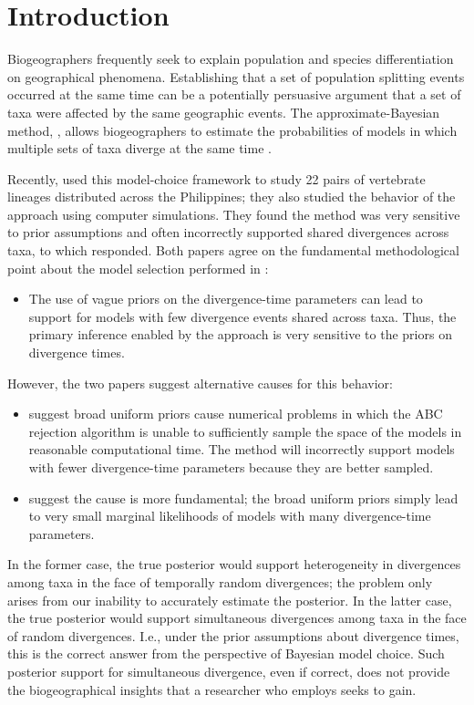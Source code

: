 \section{Introduction}
Biogeographers frequently seek to explain population and species
differentiation on geographical phenomena.
Establishing that a set of population splitting events occurred
at the same time can be a potentially persuasive argument that a set of taxa
were affected by the same geographic events.
The approximate-Bayesian method, \msb, allows biogeographers to estimate the
probabilities of models in which multiple sets of taxa diverge at the same
time \citep{Hickerson2006,Huang2011}.

Recently, \citet{Oaks2012} used this model-choice framework to study 22 pairs
of vertebrate lineages distributed across the Philippines; they also studied
the behavior of the \msb approach using computer simulations.
They found the method was very sensitive to prior assumptions and often
incorrectly supported shared divergences across taxa, to which
\citet{Hickerson2013} responded.
Both papers agree on the fundamental methodological point about the model
selection performed in \msb:
\begin{itemize}
   \item The use of vague priors on the divergence-time parameters can lead to
       support for models with few divergence events shared across taxa. Thus,
       the primary inference enabled by the approach is very sensitive to the
       priors on divergence times.
\end{itemize}
However, the two papers suggest alternative causes for this behavior:
\begin{itemize}
    \item \citep{Hickerson2013} suggest broad uniform priors cause numerical
        problems in which the ABC rejection algorithm is unable to sufficiently
        sample the space of the models in reasonable computational time. The
        method will incorrectly support models with fewer divergence-time
        parameters because they are better sampled.
    \item \citet{Oaks2012} suggest the cause is more fundamental; the broad
        uniform priors simply lead to very small marginal likelihoods of models
        with many divergence-time parameters.
\end{itemize}
In the former case, the true posterior would support heterogeneity in 
divergences among taxa in the face of temporally random divergences; the
problem only arises from our inability to accurately estimate the posterior.
In the latter case, the true posterior would support simultaneous divergences
among taxa in the face of random divergences. I.e., under the prior
assumptions about divergence times, this is the correct answer from 
the perspective of Bayesian model choice.
Such posterior support for simultaneous divergence, even if correct, does not
provide the biogeographical insights that a researcher who employs \msb seeks
to gain.

